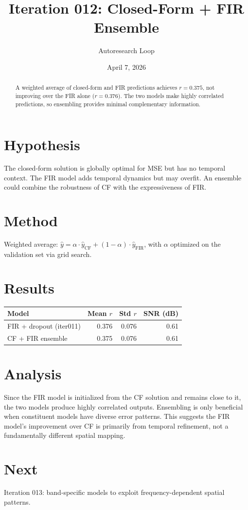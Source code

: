 \documentclass[11pt,a4paper]{article}
\title{Iteration 012: Closed-Form + FIR Ensemble}
\author{Autoresearch Loop}
\date{April 7, 2026}
\begin{document}
\maketitle

\begin{abstract}
A weighted average of closed-form and FIR predictions achieves $r=0.375$,
not improving over the FIR alone ($r=0.376$). The two models make highly
correlated predictions, so ensembling provides minimal complementary information.
\end{abstract}

\section{Hypothesis}
The closed-form solution is globally optimal for MSE but has no temporal context.
The FIR model adds temporal dynamics but may overfit. An ensemble could combine
the robustness of CF with the expressiveness of FIR.

\section{Method}
Weighted average: $\hat{y} = \alpha \cdot \hat{y}_\text{CF} + (1-\alpha) \cdot \hat{y}_\text{FIR}$,
with $\alpha$ optimized on the validation set via grid search.

\section{Results}
\begin{table}[H]
\centering
\begin{tabular}{lrrr}
\toprule
Model & Mean $r$ & Std $r$ & SNR (dB) \\
\midrule
FIR + dropout (iter011) & 0.376 & 0.076 & 0.61 \\
CF + FIR ensemble & 0.375 & 0.076 & 0.61 \\
\bottomrule
\end{tabular}
\end{table}

\section{Analysis}
Since the FIR model is initialized from the CF solution and remains close to it,
the two models produce highly correlated outputs. Ensembling is only beneficial
when constituent models have diverse error patterns. This suggests the FIR model's
improvement over CF is primarily from temporal refinement, not a fundamentally
different spatial mapping.

\section{Next}
Iteration 013: band-specific models to exploit frequency-dependent spatial patterns.
\end{document}
